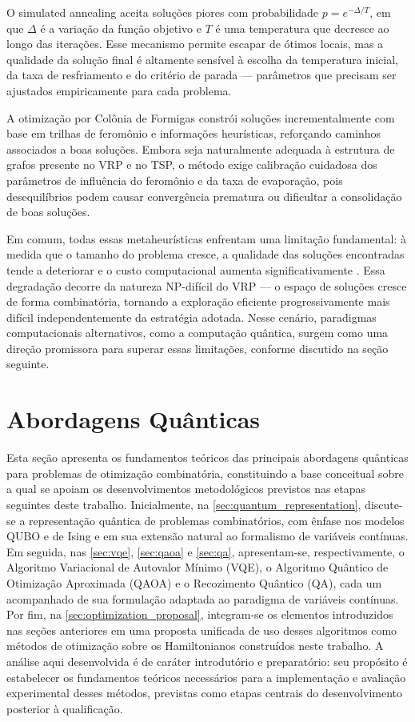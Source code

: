 O simulated annealing \cite{kirkpatrick1983optimization} aceita soluções piores com probabilidade $p = e^{-\Delta/T}$, em que $\Delta$ é a variação da função objetivo e $T$ é uma temperatura que decresce ao longo das iterações. Esse mecanismo permite escapar de ótimos locais, mas a qualidade da solução final é altamente sensível à escolha da temperatura inicial, da taxa de resfriamento e do critério de parada — parâmetros que precisam ser ajustados empiricamente para cada problema.

A otimização por Colônia de Formigas \cite{dorigo2002ant} constrói soluções incrementalmente com base em trilhas de feromônio e informações heurísticas, reforçando caminhos associados a boas soluções. Embora seja naturalmente adequada à estrutura de grafos presente no VRP e no TSP, o método exige calibração cuidadosa dos parâmetros de influência do feromônio e da taxa de evaporação, pois desequilíbrios podem causar convergência prematura ou dificultar a consolidação de boas soluções.

Em comum, todas essas metaheurísticas enfrentam uma limitação fundamental: à medida que o tamanho do problema cresce, a qualidade das soluções encontradas tende a deteriorar e o custo computacional aumenta significativamente \cite{braekers2016vehicle}. Essa degradação decorre da natureza NP-difícil do VRP — o espaço de soluções cresce de forma combinatória, tornando a exploração eficiente progressivamente mais difícil independentemente da estratégia adotada. Nesse cenário, paradigmas computacionais alternativos, como a computação quântica, surgem como uma direção promissora para superar essas limitações, conforme discutido na seção seguinte.

\section{Abordagens Quânticas}\label{sec:quantum_approach}

Esta seção apresenta os fundamentos teóricos das principais abordagens quânticas para problemas de otimização combinatória, constituindo a base conceitual sobre a qual se apoiam os desenvolvimentos metodológicos previstos nas etapas seguintes deste trabalho. Inicialmente, na \autoref{sec:quantum_representation}, discute-se a representação quântica de problemas combinatórios, com ênfase nos modelos QUBO e de Ising e em sua extensão natural ao formalismo de variáveis contínuas. Em seguida, nas \autoref{sec:vqe}, \autoref{sec:qaoa} e \autoref{sec:qa}, apresentam-se, respectivamente, o Algoritmo Variacional de Autovalor Mínimo (VQE), o Algoritmo Quântico de Otimização Aproximada (QAOA) e o Recozimento Quântico (QA), cada um acompanhado de sua formulação adaptada ao paradigma de variáveis contínuas. Por fim, na \autoref{sec:optimization_proposal}, integram-se os elementos introduzidos nas seções anteriores em uma proposta unificada de uso desses algoritmos como métodos de otimização sobre os Hamiltonianos construídos neste trabalho. A análise aqui desenvolvida é de caráter introdutório e preparatório: seu propósito é estabelecer os fundamentos teóricos necessários para a implementação e avaliação experimental desses métodos, previstas como etapas centrais do desenvolvimento posterior à qualificação.

